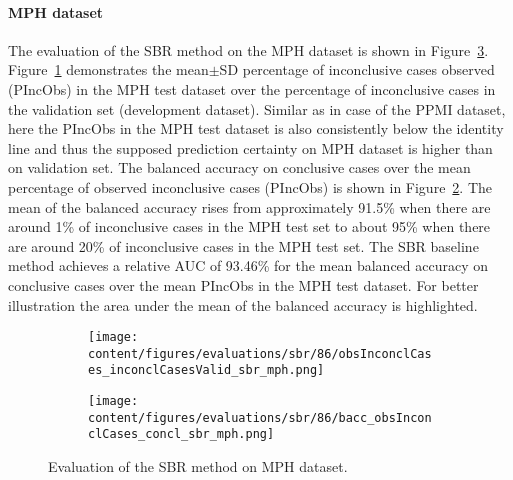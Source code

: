 
\paragraph{MPH dataset}

The evaluation of the SBR method on the MPH dataset is shown in Figure~\ref{fig:perf_results_sbr_mph}.
Figure~\ref{fig:obsInconclCases_inconclCasesValid_sbr_mph} demonstrates 
the mean$\pm$SD percentage of inconclusive cases observed (PIncObs) in the MPH test dataset 
over the percentage of inconclusive cases in the validation set (development dataset).
Similar as in case of the PPMI dataset, here the PIncObs in the MPH test dataset
is also consistently below the identity line 
and thus the supposed prediction certainty on MPH dataset is higher than on validation set.
The balanced accuracy on conclusive cases over the mean percentage of observed inconclusive cases (PIncObs) is shown 
in Figure~\ref{fig:bacc_obsInconclCases_concl_sbr_mph}.
The mean of the balanced accuracy rises from approximately 91.5\% 
when there are around 1\% of inconclusive cases in the MPH test set to about 95\% 
when there are around 20\% of inconclusive cases in the MPH test set.
The SBR baseline method achieves a relative AUC of 93.46\% for the mean balanced accuracy on conclusive cases 
over the mean PIncObs in the MPH test dataset.
For better illustration the area under the mean of the balanced accuracy is highlighted.


\begin{figure}[ht]
  \begin{subfigure}{0.9\textwidth}
    \centering
    \texttt{[image: content/figures/evaluations/sbr/86/obsInconclCases\_inconclCasesValid\_sbr\_mph.png]}
    \label{fig:obsInconclCases_inconclCasesValid_sbr_mph}
  \end{subfigure}
  \hfill
  \begin{subfigure}{0.9\textwidth}
    \centering
    \texttt{[image: content/figures/evaluations/sbr/86/bacc\_obsInconclCases\_concl\_sbr\_mph.png]}
    \label{fig:bacc_obsInconclCases_concl_sbr_mph}
  \end{subfigure}
  \caption{Evaluation of the SBR method on MPH dataset.}
  \label{fig:perf_results_sbr_mph}
\end{figure}


